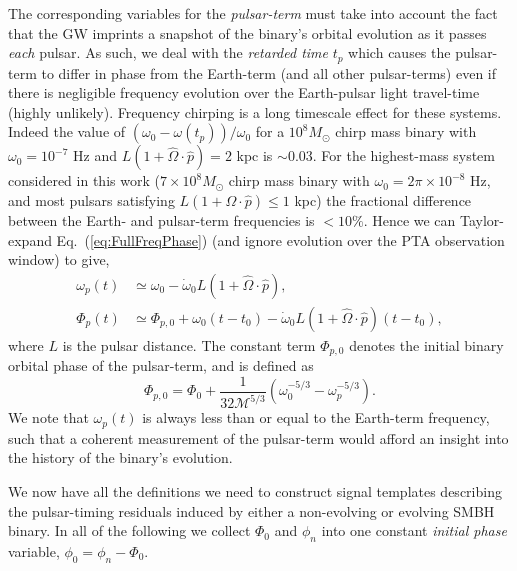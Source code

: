 \documentclass[prd,twocolumn,showpacs,nofootinbib]{revtex4}
\begin{document}
The corresponding variables for the {\it pulsar-term} must take into account the fact that the GW imprints a snapshot of the binary's orbital evolution as it passes {\it each} pulsar. As such, we deal with the {\it retarded time} $t_p$ which causes the pulsar-term to differ in phase from the Earth-term (and all other pulsar-terms) even if there is negligible frequency evolution over the Earth-pulsar light travel-time (highly unlikely). Frequency chirping is a long timescale effect for these systems. Indeed the value of $(\omega_0 - \omega(t_p))/\omega_0$ for a $10^8M_{\odot}$ chirp mass binary with $\omega_0=10^{-7}$ Hz and $L(1+\hat\Omega\cdot\hat{p})=2$ kpc is $\sim 0.03$. For the highest-mass system considered in this work ($7\times 10^8 M_{\odot}$ chirp mass binary with $\omega_0=2\pi\times 10^{-8}$ Hz, and most pulsars satisfying $L(1 + \Omega\cdot\hat{p})\leq 1$ kpc) the fractional difference between the Earth- and pulsar-term frequencies is $< 10\%$.
Hence we can Taylor-expand Eq.\ (\ref{eq:FullFreqPhase}) (and ignore evolution over the PTA observation window) to give,
\begin{align}
\omega_p(t) &\simeq \omega_0 - \dot\omega_0L(1+\hat\Omega\cdot\hat{p}),\nonumber\\
\Phi_p(t) &\simeq \Phi_{p,0} + \omega_0(t-t_0) - \dot\omega_0L(1+\hat\Omega\cdot\hat{p})(t-t_0),
\end{align}
where $L$ is the pulsar distance. The constant term $\Phi_{p,0}$ denotes the initial binary orbital phase of the pulsar-term, and is defined as
\begin{equation}
\Phi_{p,0} = \Phi_0 + \frac{1}{32\mathcal{M}^{5/3}}\left(\omega_0^{-5/3} - \omega_p^{-5/3}\right).
\end{equation}
We note that $\omega_p(t)$ is always less than or equal to the Earth-term frequency, such that a coherent measurement of the pulsar-term would afford an insight into the history of the binary's evolution.

We now have all the definitions we need to construct signal templates describing the pulsar-timing residuals induced by either a non-evolving or evolving SMBH binary. In all of the following we collect $\Phi_0$ and $\phi_n$ into one constant {\it initial phase} variable, $\phi_0 = \phi_n - \Phi_0$. 
\end{document}
